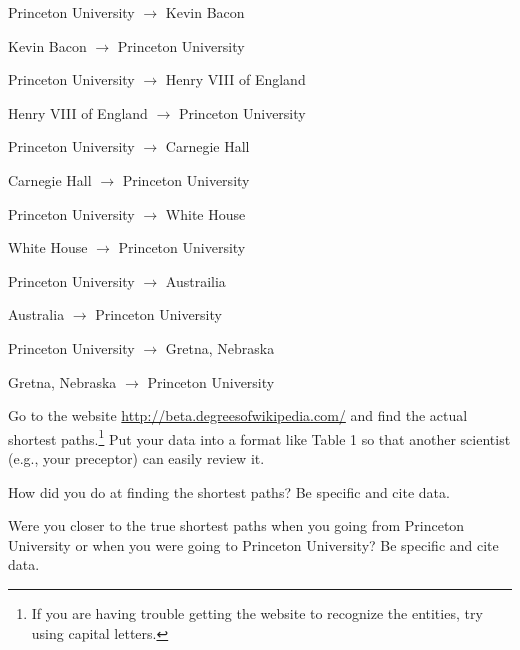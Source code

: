 \documentclass[addpoints]{exam}
\begin{document}
\begin{questions}
\question[2] Princeton University $\rightarrow$ Kevin Bacon
\vspace{1in}


\question[2] Kevin Bacon $\rightarrow$ Princeton University 
\vspace{1in}

\question[2] Princeton University $\rightarrow$ Henry VIII of England
\vspace{1in}

\question[2] Henry VIII of England $\rightarrow$ Princeton University 
\vspace{1in}

\question[2] Princeton University $\rightarrow$ Carnegie Hall
\vspace{1in}

\question[2] Carnegie Hall $\rightarrow$ Princeton University 
\vspace{1in}

\question[2] Princeton University $\rightarrow$ White House
\vspace{1in}

\question[2] White House $\rightarrow$ Princeton University 
\vspace{1in}

\question[2] Princeton University $\rightarrow$ Austrailia
\vspace{1in}

\question[2] Australia $\rightarrow$ Princeton University 
\vspace{1in}

\question[2] Princeton University $\rightarrow$ Gretna, Nebraska
\vspace{1in}

\question[2] Gretna, Nebraska $\rightarrow$ Princeton University 
\vspace{1in}

\question[1]Go to the website \url{http://beta.degreesofwikipedia.com/} and find the actual shortest paths.\footnote{If you are having trouble getting the website to recognize the entities, try using capital letters.}  Put your data into a format like Table 1 so that another scientist (e.g., your preceptor) can easily review it.

\question[6] How did you do at finding the shortest paths?  Be specific and cite data.
\vspace{1in}

\question[6] Were you closer to the true shortest paths when you going from Princeton University or when you were going to Princeton University?  Be specific and cite data.
\vspace{1in}


\end{questions}
\end{document}
